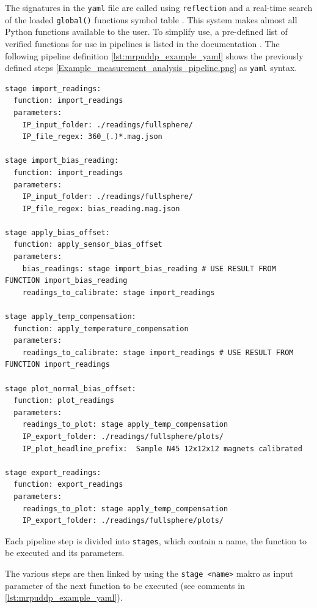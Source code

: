 The signatures in the \passthrough{\lstinline!yaml!} file are called
using \passthrough{\lstinline!reflection!} and a real-time search of the
loaded \passthrough{\lstinline!global()!} functions symbol table
\cite{PythonGlobalSymbolTable}. This system makes almost all Python
functions available to the user. To simplify use, a pre-defined list of
verified functions for use in pipelines is listed in the documentation
\cite{MagneticReadoutProcessingReadTheDocs}. The following pipeline
definition \ref{lst:mrpuddp_example_yaml} shows the previously defined
steps \ref{Example_measurement_analysis_pipeline.png} as
\passthrough{\lstinline!yaml!} syntax.

\begin{lstlisting}[caption={Example YAML code of an user defined processing pipeline with six stages linked together}, label=lst:mrpuddp_example_yaml]
stage import_readings:
  function: import_readings
  parameters:
    IP_input_folder: ./readings/fullsphere/
    IP_file_regex: 360_(.)*.mag.json

stage import_bias_reading:
  function: import_readings
  parameters:
    IP_input_folder: ./readings/fullsphere/
    IP_file_regex: bias_reading.mag.json

stage apply_bias_offset:
  function: apply_sensor_bias_offset
  parameters:
    bias_readings: stage import_bias_reading # USE RESULT FROM FUNCTION import_bias_reading
    readings_to_calibrate: stage import_readings

stage apply_temp_compensation:
  function: apply_temperature_compensation
  parameters:
    readings_to_calibrate: stage import_readings # USE RESULT FROM FUNCTION import_readings

stage plot_normal_bias_offset:
  function: plot_readings
  parameters:
    readings_to_plot: stage apply_temp_compensation
    IP_export_folder: ./readings/fullsphere/plots/
    IP_plot_headline_prefix:  Sample N45 12x12x12 magnets calibrated

stage export_readings:
  function: export_readings
  parameters:
    readings_to_plot: stage apply_temp_compensation
    IP_export_folder: ./readings/fullsphere/plots/
\end{lstlisting}

Each pipeline step is divided into \passthrough{\lstinline!stages!},
which contain a name, the function to be executed and its parameters.

\newpage

The various steps are then linked by using the
\passthrough{\lstinline!stage <name>!} makro as input parameter of the
next function to be executed (see comments in
\ref{lst:mrpuddp_example_yaml}).

